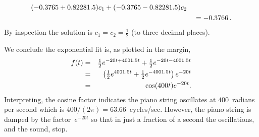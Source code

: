 \begin{example}
\begin{solution}
\begin{enumerate}
\begin{eqnarray*}
(-0.3765 + 0.82281.5)c_1+(-0.3765 - 0.82281.5)c_2
\\&&{}
=-0.3766\,.
\end{eqnarray*}
By inspection the solution is \(c_1=c_2=\tfrac12\) (to three decimal places).
\end{enumerate}
%
We conclude the exponential fit is, as plotted in the margin,
\begin{eqnarray*}
f(t)&=&\tfrac12e^{-20t+4001.5 t}+\tfrac12e^{-20t-4001.5 t}
\\&=&\left(\tfrac12e^{4001.5 t}+\tfrac12e^{-4001.5 t}\right)e^{-20t}
\\&=&\cos(400t)e^{-20t}.
\end{eqnarray*}
Interpreting, the cosine factor indicates the piano string oscillates at \(400\)~radians per second which is \(400/(2\pi)=63.66\)~cycles/sec.
%
However, the piano string is damped by the factor~\(e^{-20t}\) so that in just a fraction of a second the oscillations, and the sound, stop.
\end{solution}
\end{example}




